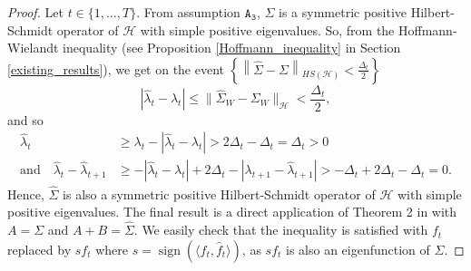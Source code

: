 \documentclass[twoside,11pt]{article}
\newcommand{\Hk}{\mathcal{H}}
\newcommand{\HSk}{HS(\mathcal{H})}
\newcommand{\SW}{\Sigma}
\newcommand{\hS}{\widehat{\Sigma}}
\newcommand{\A}[1]{$\mathtt{A_#1}$}
\DeclareMathOperator{\sign}{sign}
\begin{document}
\begin{proof}
    Let $t \in \{1,\ldots,T\}$. From assumption \A{3}, $\SW$ is a symmetric positive Hilbert-Schmidt operator of $\Hk$ with simple positive eigenvalues. 
    So, from the Hoffmann-Wielandt inequality \citep{bhatia1994hoffman} (see Proposition \ref{Hoffmann_inequality} in Section \ref{existing_results}), we get on the event $\left \{\left \| \hS - \SW \right \|_{\HSk} < \frac{\Delta_t}{2} \right\}$ 
    $$ | \widehat{\lambda}_t - \lambda_t | \leq \| \widehat{\Sigma}_W - \Sigma_W \|_{\Hk} < \frac{\Delta_t}{2},$$ and so 
    \begin{align*}
        \widehat{\lambda}_t & \geq \lambda_t - |\widehat{\lambda}_t - \lambda_t| > 2 \Delta_t - \Delta_t = \Delta_t > 0 \\
        \text{and} \quad \widehat{\lambda}_t - \widehat{\lambda}_{t+1} & \geq - | \widehat{\lambda}_t - \lambda_t | + 2 \Delta_t - | \lambda_{t+1} - \widehat{\lambda}_{t+1} | > - \Delta_t + 2 \Delta_t- \Delta_t = 0.
    \end{align*}
    Hence, $\hS$ is also a symmetric positive Hilbert-Schmidt operator of $\Hk$ with simple positive eigenvalues. 
    The final result is a direct application of Theorem 2 in \citep{zwald2005convergence} with $A = \SW$ and $A + B=\hS$.
    We easily check that the inequality is satisfied with  $f_t$ replaced by $s f_t$ where $s = \sign( \langle f_t, \widehat{f}_t \rangle)$, as $s f_t$ is also an eigenfunction of $\SW$.
\end{proof}
\end{document}
